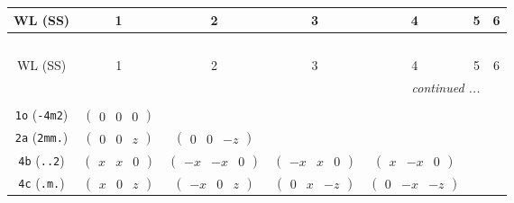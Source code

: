 \documentclass[fleqn,9pt,landscape]{jsarticle}
\begin{document}
\begin{center}
\renewcommand{\arraystretch}{1.2}
\begin{longtable}{ccccccc}
 \hline \hline
WL (SS) & 1 & 2 & 3 & 4 & 5 & 6 \\ \hline \endfirsthead

\multicolumn{6}{l}{\tablename\ \thetable{}} \\
 \hline \hline
WL (SS) & 1 & 2 & 3 & 4 & 5 & 6 \\ \hline \endhead

 \hline \hline
\multicolumn{6}{r}{\footnotesize\it continued ...} \\ \endfoot

 \hline \hline
\multicolumn{6}{r}{} \\ \endlastfoot

{\tt 1o} ({\tt -4m2}) & $ \begin{pmatrix} 0 & 0 & 0 \end{pmatrix} $ & $  $ & $  $ & $  $ & $  $ & $  $ \\ \hline
{\tt 2a} ({\tt 2mm.}) & $ \begin{pmatrix} 0 & 0 & z \end{pmatrix} $ & $ \begin{pmatrix} 0 & 0 & - z \end{pmatrix} $ & $  $ & $  $ & $  $ & $  $ \\ \hline
{\tt 4b} ({\tt ..2}) & $ \begin{pmatrix} x & x & 0 \end{pmatrix} $ & $ \begin{pmatrix} - x & - x & 0 \end{pmatrix} $ & $ \begin{pmatrix} - x & x & 0 \end{pmatrix} $ & $ \begin{pmatrix} x & - x & 0 \end{pmatrix} $ & $  $ & $  $ \\ \hline
{\tt 4c} ({\tt .m.}) & $ \begin{pmatrix} x & 0 & z \end{pmatrix} $ & $ \begin{pmatrix} - x & 0 & z \end{pmatrix} $ & $ \begin{pmatrix} 0 & x & - z \end{pmatrix} $ & $ \begin{pmatrix} 0 & - x & - z \end{pmatrix} $ & $  $ & $  $ \\ \hline

\end{longtable}
\end{center}
\end{document}
